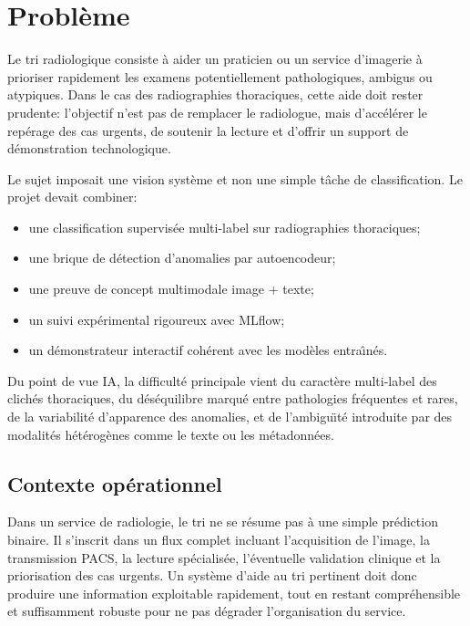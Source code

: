 \documentclass[11pt,a4paper]{article}
\newif\ifsectionbreakenabled
\let\oldsection\section
\renewcommand{\section}[1]{%
    \ifsectionbreakenabled
        \clearpage
    \else
        \sectionbreakenabledtrue
    \fi
    \oldsection{#1}%
}
\begin{document}
\clearpage
\tableofcontents
\clearpage
{}

\section{Probl\`eme}
Le tri radiologique consiste \`a aider un praticien ou un service d'imagerie \`a prioriser rapidement les examens potentiellement pathologiques, ambigus ou atypiques. Dans le cas des radiographies thoraciques, cette aide doit rester prudente: l'objectif n'est pas de remplacer le radiologue, mais d'acc\'el\'erer le rep\'erage des cas urgents, de soutenir la lecture et d'offrir un support de d\'emonstration technologique.

Le sujet imposait une vision syst\`eme et non une simple t\^ache de classification. Le projet devait combiner:
\begin{itemize}
    \item une classification supervis\'ee multi-label sur radiographies thoraciques;
    \item une brique de d\'etection d'anomalies par autoencodeur;
    \item une preuve de concept multimodale image + texte;
    \item un suivi exp\'erimental rigoureux avec MLflow;
    \item un d\'emonstrateur interactif coh\'erent avec les mod\`eles entra\^\i n\'es.
\end{itemize}

Du point de vue IA, la difficult\'e principale vient du caract\`ere multi-label des clich\'es thoraciques, du d\'es\'equilibre marqu\'e entre pathologies fr\'equentes et rares, de la variabilit\'e d'apparence des anomalies, et de l'ambigu\"\i t\'e introduite par des modalit\'es h\'et\'erog\`enes comme le texte ou les m\'etadonn\'ees.

\subsection{Contexte op\'erationnel}
Dans un service de radiologie, le tri ne se r\'esume pas \`a une simple pr\'ediction binaire. Il s'inscrit dans un flux complet incluant l'acquisition de l'image, la transmission PACS, la lecture sp\'ecialis\'ee, l'\'eventuelle validation clinique et la priorisation des cas urgents. Un syst\`eme d'aide au tri pertinent doit donc produire une information exploitable rapidement, tout en restant compr\'ehensible et suffisamment robuste pour ne pas d\'egrader l'organisation du service.
\end{document}
